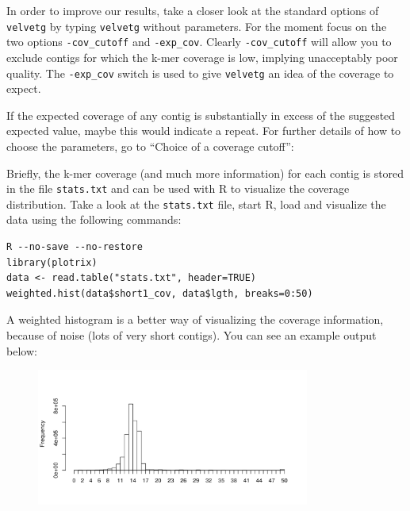 \begin{information}
In order to improve our results, take a closer look at the standard options of
\texttt{velvetg} by typing \texttt{velvetg} without parameters. For the moment
focus on the two options \texttt{-cov\_cutoff} and \texttt{-exp\_cov}. Clearly
\texttt{-cov\_cutoff} will allow you to exclude contigs for which the k-mer
coverage is low, implying unacceptably poor quality.
The \texttt{-exp\_cov} switch is used to give \texttt{velvetg} an idea of the
coverage to expect.

If the expected coverage of any contig is substantially in excess of the
suggested expected value, maybe this would indicate a repeat. For further
details of how to choose the parameters, go to ``Choice of a coverage cutoff'':


\end{information}

\begin{steps}
Briefly, the k-mer coverage (and much more information) for each contig is stored
in the file \texttt{stats.txt} and can be used with R to visualize the coverage
distribution. Take a look at the \texttt{stats.txt} file, start R, load and
visualize the data using the following commands:
\begin{lstlisting}
R --no-save --no-restore
library(plotrix)
data <- read.table("stats.txt", header=TRUE)
weighted.hist(data$short1_cov, data$lgth, breaks=0:50)
\end{lstlisting}

A weighted histogram is a better way of visualizing the coverage information,
because of noise (lots of very short contigs). You can see an example output
below:
\end{steps}

\begin{figure}[H]
\centering
\includegraphics[width=0.8\textwidth]{de_novo/velvet/velvet_Rplot001.png}
\label{fig:SRS004748_coverage_hist}
\end{figure}

